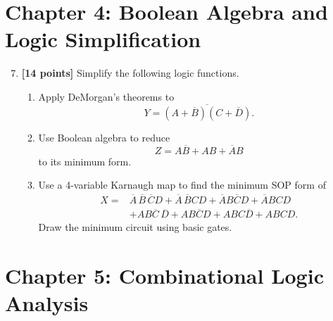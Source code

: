 \documentclass[11pt]{article}
\begin{document}
\vspace{4cm}

\section{Chapter 4: Boolean Algebra and Logic Simplification}

\begin{enumerate}
\setcounter{enumi}{6}

\item \textbf{[14 points]} Simplify the following logic functions.

\begin{enumerate}[label=(\alph*)]
    \item Apply DeMorgan's theorems to
    \begin{equation*}
        Y=\overline{(A+\overline{B})(C+\overline{D})}.
    \end{equation*}

    \item Use Boolean algebra to reduce
    \begin{equation*}
        Z=A\overline{B}+AB+\overline{A}B
    \end{equation*}
    to its minimum form.

    \item Use a 4-variable Karnaugh map to find the minimum SOP form of
    \begin{align*}
    X={}&\overline{A}\,\overline{B}\,\overline{C}D
      +\overline{A}\,\overline{B}CD
      +\overline{A}B\overline{C}D
      +\overline{A}BCD\\
      &+AB\overline{C}\,\overline{D}
      +AB\overline{C}D
      +ABC\overline{D}
      +ABCD.
    \end{align*}
    Draw the minimum circuit using basic gates.
\end{enumerate}
\end{enumerate}

\vspace{6cm}

\section{Chapter 5: Combinational Logic \\ Analysis}
\end{document}
